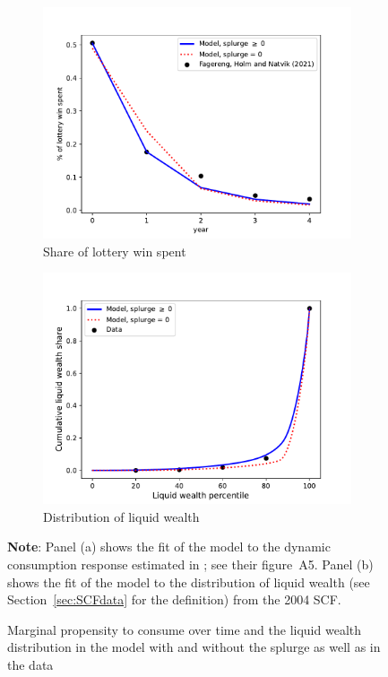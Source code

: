 \begin{figure}[htb]
	\centering
	\begin{subfigure}[b]{.48\linewidth}
		\centering
		\includegraphics[width=\linewidth]{text/Chapter3/Code/HA-Models/Target_AggMPCX_LiquWealth/Figures/AggMPC_LotteryWin_comparison_splurge0}
		\caption{Share of lottery win spent}

	\end{subfigure}
	\begin{subfigure}[b]{.48\linewidth}
		\centering
		\includegraphics[width=\linewidth]{text/Chapter3/Code/HA-Models/Target_AggMPCX_LiquWealth/Figures/LiquWealth_Distribution_comparison_splurge0}
		\caption{Distribution of liquid wealth}
	\end{subfigure}%
	\caption{Marginal propensity to consume over time and the liquid wealth distribution in the model with and without the splurge as well as in the data}
	\label{fig:splurge0_Norwayestimation}
	\parbox{16cm}{\small \vspace{.15cm} \textbf{Note}: Panel (a) shows the fit of the model to the dynamic consumption response estimated in {\citet{fagereng_mpc_2021}}; see their figure~A5.
Panel (b) shows the fit of the model to the distribution of liquid wealth (see Section~\ref{sec:SCFdata} for the definition) from the 2004 SCF.\normalsize}
\end{figure}


